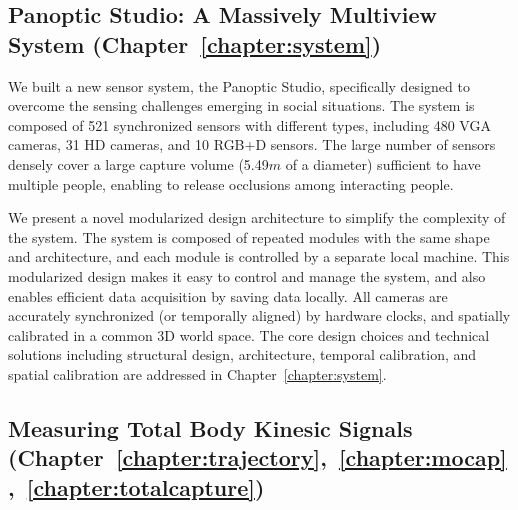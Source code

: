 \subsection{Panoptic Studio: A Massively Multiview System (Chapter~\ref{chapter:system})}
We built a new sensor system, the Panoptic Studio, specifically designed to overcome the sensing challenges emerging in social situations. The system is composed of 521 synchronized sensors with different types, including 480 VGA cameras, 31 HD cameras, and 10 RGB+D sensors. The large number of sensors densely cover a large capture volume (5.49$m$ of a diameter) sufficient to have multiple people, enabling to release occlusions among interacting people. 

We present a novel modularized design architecture to simplify the complexity of the system. The system is composed of repeated modules with the same shape and architecture, and each module is controlled by a separate local machine. This modularized design makes it easy to control and manage the system, and also enables efficient data acquisition by saving data locally. All cameras are accurately synchronized (or temporally aligned) by hardware clocks, and spatially calibrated in a common 3D world space. The core design choices and technical solutions including structural design, architecture, temporal calibration, and spatial calibration are addressed in Chapter~\ref{chapter:system}.



\subsection{Measuring Total Body Kinesic Signals (Chapter~\ref{chapter:trajectory},~\ref{chapter:mocap},~\ref{chapter:totalcapture})}


